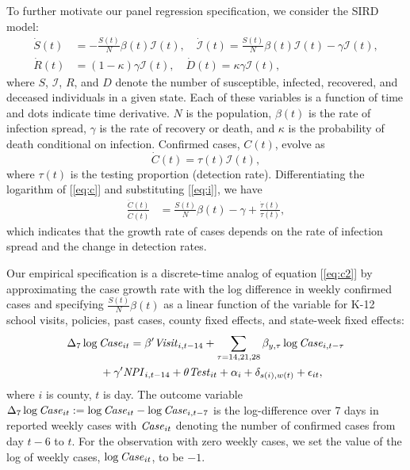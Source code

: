 \documentclass[9pt,twocolumn,twoside,lineno]{pnas-new}
\providecommand{\Infected}{{\mathcal{I}}}
\providecommand{\Recovered}{{R}}
\begin{document}
To further motivate our panel regression specification, we consider the SIRD
model:
\begin{align}
  \dot{S}(t) & = -\frac{S(t)}{N} \beta(t) \Infected(t),\quad
  \dot{\Infected}(t)   = \frac{S(t)}{N} \beta(t) \Infected(t) - \gamma  \Infected(t), \label{eq:i}\\
  \dot{\Recovered}(t) & = (1-\kappa) \gamma  \Infected(t),\quad   \dot{D}(t)  = \kappa \gamma \Infected(t), \nonumber %
  \label{eq:d}
\end{align}
where $S$, $\Infected$, $\Recovered$, and $D$ denote the number of susceptible,
infected, recovered, and deceased individuals in a given state.  Each of these variables is a function of time and dots indicate time derivative. $N$ is the population, $\beta(t)$ is the rate of infection
spread, $\gamma$ is the rate of recovery or death, and $\kappa$ is the
probability of death conditional on infection. Confirmed cases, $C(t)$, evolve as
\begin{equation}
  \dot{C}(t) = \tau(t) \Infected(t), \label{eq:c}
\end{equation}
where $\tau(t)$ is the testing proportion (detection rate). Differentiating the logarithm of [\ref{eq:c}] and substituting [\ref{eq:i}], we have
\begin{align} 
  \frac{\ddot{C}(t)}{\dot{C}(t)}
              & =
                \frac{S(t)}{N} \beta(t) -\gamma  + \frac{\dot{\tau}(t)}{\tau(t)}, \label{eq:c2} 
\end{align}
which indicates that the growth rate of cases depends on the rate of infection spread and the change in detection rates.

Our empirical specification is a discrete-time analog of equation [\ref{eq:c2}] by approximating the case growth rate with the log difference in weekly confirmed cases and specifying $\frac{S(t)}{N}\beta(t)$ as a linear function of the variable for K-12 school visits, policies,  past cases,
 county fixed effects, and state-week fixed effects:
\begin{align}
&\Delta_7 \log \text{\textit{Case}}_{it}  =  \beta' \text{\textit{Visit}}_{i,t-14}  +   \sum_{\tau=14,21,28} \beta_{y,\tau} \log \text{\textit{Case}}_{i,t-\tau}  \nonumber\\
&\quad\qquad + \gamma' \text{\textit{NPI}}_{i,t-14}  + \theta \text{\textit{Test}}_{it}+\alpha_i +\delta_{s(i),w(t)} + \epsilon_{it},  \label{eq:panel-1} 
\end{align}
where $i$ is county, $t$ is day. The outcome variable $\Delta_7 \log \text{\textit{Case}}_{it}:=\log \text{\textit{Case}}_{it}-\log \text{\textit{Case}}_{i,t-7}$ is the log-difference  over 7 days in reported weekly cases with $\text{\textit{Case}}_{it}$ denoting the number of confirmed cases from day $t-6$ to $t$. For the observation with zero weekly cases,  we set the value of the log of weekly cases, $\log \text{\textit{Case}}_{it}$, to be $-1$.
\end{document}
